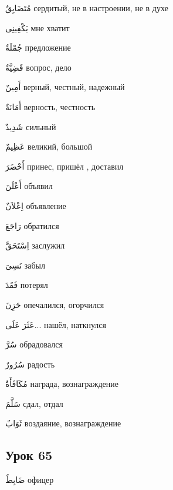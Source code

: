 \documentclass[a5paper]{article}
\newcommand\textstyleDropCaps[1]{#1}
\newcommand\textstyleCaptioncharacters[1]{#1}
\begin{document}
\textstyleCaptioncharacters{مُتَضَايِقٌ }\textstyleDropCaps{сердитый, не в настроении, не в духе‎}

\textstyleCaptioncharacters{يَكْفِينِى }\textstyleDropCaps{мне хватит‎}

\textstyleCaptioncharacters{جُمْلَةٌ }\textstyleDropCaps{предложение‎}

\textstyleCaptioncharacters{قَضِيَّةٌ }\textstyleDropCaps{вопрос, дело‎}

\textstyleCaptioncharacters{أَمِينٌ }\textstyleDropCaps{верный, честный, на­дежный‎}

\textstyleCaptioncharacters{أَمَانَةٌ }\textstyleDropCaps{верность, честность‎}

\textstyleCaptioncharacters{شَدِيدٌ }\textstyleDropCaps{сильный‎}

\textstyleCaptioncharacters{عَظِيمٌ }\textstyleDropCaps{великий, большой‎}

\textstyleCaptioncharacters{أَحْضَرَ }\textstyleDropCaps{принес, пришёл , доставил‎}

\textstyleCaptioncharacters{أَعْلَنَ }\textstyleDropCaps{объявил‎}

\textstyleCaptioncharacters{اِعْلاَنٌ }\textstyleDropCaps{объявление‎}

\textstyleCaptioncharacters{رَاجَعَ }\textstyleDropCaps{обратился‎}

\textstyleCaptioncharacters{اِسْتَحَقَّ }\textstyleDropCaps{заслужил‎}

\textstyleCaptioncharacters{نَسِىَ }\textstyleDropCaps{забыл‎}

\textstyleCaptioncharacters{فَقَدَ }\textstyleDropCaps{потерял‎}

\textstyleCaptioncharacters{حَزِنَ }\textstyleDropCaps{опечалился, огор­чился‎}

\textstyleCaptioncharacters{عَثَرَ عَلَى... }\textstyleDropCaps{нашёл, нат­кнулся‎}

\textstyleCaptioncharacters{سُرَّ }\textstyleDropCaps{обрадовался‎}

\textstyleCaptioncharacters{سُرُورٌ }\textstyleDropCaps{радость‎}

\textstyleCaptioncharacters{مُكَافَأَةٌ }\textstyleDropCaps{награда, вознагра­ждение‎}

\textstyleCaptioncharacters{سَلَّمَ }\textstyleDropCaps{сдал, отдал‎}

\textstyleCaptioncharacters{ثَوَابٌ }\textstyleDropCaps{воздаяние, возна­граждение‎}

\subsection[Урок 65‎]{\textstyleDropCaps{Урок 65‎}}
\textstyleCaptioncharacters{ضَابِطٌ }\textstyleDropCaps{офицер‎}
\end{document}
